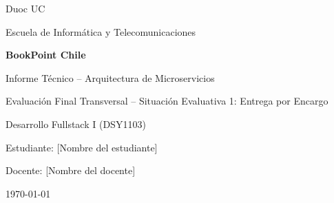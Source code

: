 \documentclass[12pt,a4paper]{report}
\newcommand{\nombreEstudiante}{[Nombre del estudiante]}
\newcommand{\nombreDocente}{[Nombre del docente]}
\newcommand{\nombreAsignatura}{Desarrollo Fullstack I (DSY1103)}
\newcommand{\nombreInstitucion}{Duoc UC}
\newcommand{\fechaInforme}{\today}
\begin{document}
\begin{titlepage}
    \centering
    \vspace*{2cm}

    {\Large \nombreInstitucion \par}
    \vspace{0.3cm}
    {\large Escuela de Informática y Telecomunicaciones \par}
    \vspace{2cm}

    {\Huge \bfseries BookPoint Chile \par}
    \vspace{0.5cm}
    {\Large Informe Técnico -- Arquitectura de Microservicios \par}
    \vspace{0.3cm}
    {\large Evaluación Final Transversal -- Situación Evaluativa 1: Entrega por Encargo \par}

    \vspace{3cm}

    {\large \nombreAsignatura \par}
    \vspace{0.5cm}
    {\large Estudiante: \nombreEstudiante \par}
    \vspace{0.3cm}
    {\large Docente: \nombreDocente \par}

    \vfill

    {\large \fechaInforme \par}
\end{titlepage}

\tableofcontents
\clearpage










\end{document}
